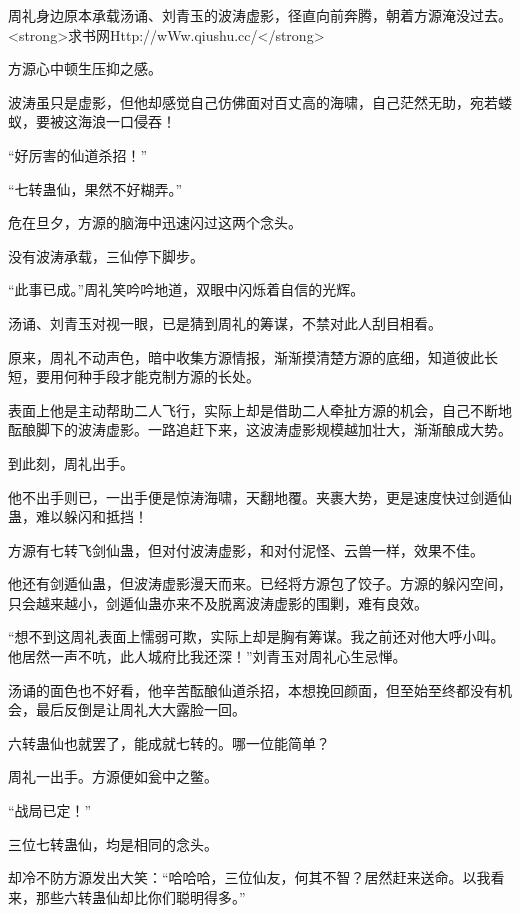 
\begin{this_body}

周礼身边原本承载汤诵、刘青玉的波涛虚影，径直向前奔腾，朝着方源淹没过去。<strong>求书网Http://wWw.qiushu.cc/</strong>

方源心中顿生压抑之感。

波涛虽只是虚影，但他却感觉自己仿佛面对百丈高的海啸，自己茫然无助，宛若蝼蚁，要被这海浪一口侵吞！

“好厉害的仙道杀招！”

“七转蛊仙，果然不好糊弄。”

危在旦夕，方源的脑海中迅速闪过这两个念头。

没有波涛承载，三仙停下脚步。

“此事已成。”周礼笑吟吟地道，双眼中闪烁着自信的光辉。

汤诵、刘青玉对视一眼，已是猜到周礼的筹谋，不禁对此人刮目相看。

原来，周礼不动声色，暗中收集方源情报，渐渐摸清楚方源的底细，知道彼此长短，要用何种手段才能克制方源的长处。

表面上他是主动帮助二人飞行，实际上却是借助二人牵扯方源的机会，自己不断地酝酿脚下的波涛虚影。一路追赶下来，这波涛虚影规模越加壮大，渐渐酿成大势。

到此刻，周礼出手。

他不出手则已，一出手便是惊涛海啸，天翻地覆。夹裹大势，更是速度快过剑遁仙蛊，难以躲闪和抵挡！

方源有七转飞剑仙蛊，但对付波涛虚影，和对付泥怪、云兽一样，效果不佳。

他还有剑遁仙蛊，但波涛虚影漫天而来。已经将方源包了饺子。方源的躲闪空间，只会越来越小，剑遁仙蛊亦来不及脱离波涛虚影的围剿，难有良效。

“想不到这周礼表面上懦弱可欺，实际上却是胸有筹谋。我之前还对他大呼小叫。他居然一声不吭，此人城府比我还深！”刘青玉对周礼心生忌惮。

汤诵的面色也不好看，他辛苦酝酿仙道杀招，本想挽回颜面，但至始至终都没有机会，最后反倒是让周礼大大露脸一回。

六转蛊仙也就罢了，能成就七转的。哪一位能简单？

周礼一出手。方源便如瓮中之鳖。

“战局已定！”

三位七转蛊仙，均是相同的念头。

却冷不防方源发出大笑：“哈哈哈，三位仙友，何其不智？居然赶来送命。以我看来，那些六转蛊仙却比你们聪明得多。”


\end{this_body}
